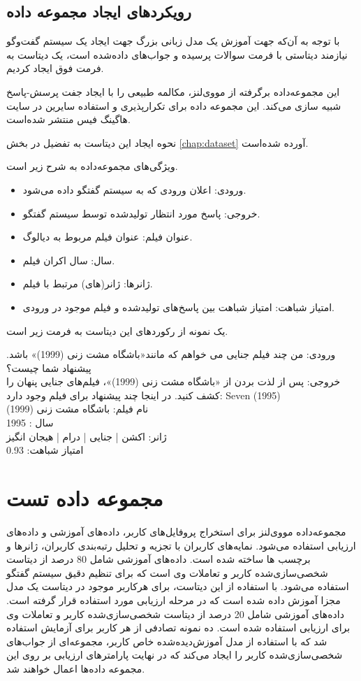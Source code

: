 \subsection{رویکردهای ایجاد مجموعه داده} 
با توجه به آن‌که جهت آموزش یک مدل زبانی بزرگ جهت ایجاد یک سیستم گفت‌وگو نیازمند دیتاستی با فرمت سوالات پرسیده و جواب‌های داده‌شده است، یک دیتاست به فرمت فوق ایجاد کردیم.

این مجموعه‌داده برگرفته از مووی‌لنز، مکالمه طبیعی را با ایجاد جفت پرسش-پاسخ شبیه سازی می‌کند. این مجموعه داده برای تکرارپذیری و استفاده سایرین در سایت هاگینگ فیس منتشر شده‌است. 

نحوه ایجاد این دیتاست به تفضیل در بخش 
\ref{chap:dataset}
آورده شده‌است.

ویژگی‌های مجموعه‌داده به شرح زیر است.
\begin{itemize}
\item
ورودی: اعلان ورودی که به سیستم گفتگو داده می‌شود.
\item
 خروجی: پاسخ مورد انتظار تولید‌شده توسط سیستم گفتگو.
\item
 عنوان فیلم: عنوان فیلم مربوط به دیالوگ.
\item
 سال: سال اکران فیلم.
\item
 ژانرها: ژانر(های) مرتبط با فیلم.
\item
امتیاز شباهت: امتیاز شباهت بین پاسخ‌های تولید‌شده و فیلم موجود در ورودی.
\end{itemize}	

یک نمونه از رکوردهای این دیتاست به فرمت زیر است.

 ورودی: من چند فیلم جنایی می خواهم که مانند«باشگاه مشت زنی (1999)» باشد. پیشنهاد شما چیست؟\\
 خروجی: پس از لذت بردن از «باشگاه مشت زنی (1999)»، فیلم‌های جنایی پنهان را کشف کنید. در اینجا چند پیشنهاد برای فیلم وجود دارد: Seven (1995)\\
 نام فیلم: باشگاه مشت زنی (1999)\\
 سال : 1995\\
 ژانر: اکشن | جنایی | درام | هیجان انگیز\\
 امتیاز شباهت: 
\num{0.93}\\


\section{مجموعه داده تست}
مجموعه‌داده مووی‌لنز برای استخراج پروفایل‌های کاربر، داده‌های آموزشی و داده‌های ارزیابی استفاده می‌شود.
نمایه‌های کاربران با تجزیه و تحلیل رتبه‌بندی کاربران، ژانرها و برچسب ها ساخته شده است.
\newline
داده‌های آموزشی شامل 80 درصد از دیتاست شخصی‌سازی‌شده کاربر و تعاملات وی است که برای تنظیم دقیق سیستم گفتگو استفاده می‌شود. با استفاده از این دیتاست، برای هرکاربر موجود در دیتاست یک مدل مجزا آموزش داده شده است که در مرحله ارزیابی مورد استفاده قرار گرفته‌ است.
\newline
داده‌های آموزشی شامل 20 درصد از دیتاست شخصی‌سازی‌شده کاربر و تعاملات وی برای ارزیابی استفاده شده است. ده نمونه تصادفی از هر کاربر برای آزمایش استفاده شد که با استفاده از مدل آموزش‌دیده‌شده خاص کاربر، مجموعه‌ای از جواب‌های شخصی‌سازی‌شده کاربر را ایجاد می‌کند که در نهایت پارامترهای ارزیابی بر روی این مجموعه داده‌ها اعمال خواهند شد.



